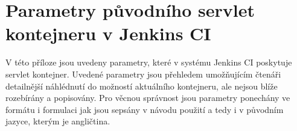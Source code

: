 
\chapter{Parametry původního servlet kontejneru v Jenkins CI} \label{prilohaParametry}
    V této příloze jsou  uvedeny parametry, které v systému Jenkins CI poskytuje
    servlet kontejner. Uvedené parametry jsou přehledem umožňujícím čtenáři
    detailnější náhlédnutí do možností aktuálního kontejneru, ale 
    nejsou blíže rozebírány a popisovány. Pro věcnou správnost 
    jsou parametry ponechány ve formátu i formulaci jak jsou 
    sepsány v návodu použití a tedy i v původním jazyce, kterým je angličtina.

